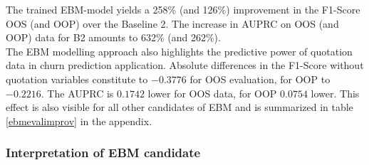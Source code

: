 \documentclass[12pt,titlepage]{article}
\begin{document}
\noindent
The trained EBM-model yields a 258\% (and 126\%) improvement in the F1-Score OOS (and OOP) over the Baseline 2. The increase in AUPRC on OOS (and OOP) data for B2 amounts to 632\% (and 262\%). \\
The EBM modelling approach also highlights the predictive power of quotation data in churn prediction application. Absolute differences in the F1-Score without quotation variables constitute to $-0.3776$ for OOS evaluation, for OOP to $-0.2216$. The AUPRC is $0.1742$ lower for OOS data, for OOP $0.0754$ lower. This effect is also visible for all other candidates of EBM and is summarized in table \ref{ebmevalimprov} in the appendix. \\

\subsubsection*{Interpretation of EBM candidate}
\end{document}

